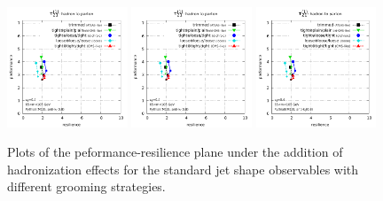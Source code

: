 \documentclass[11pt,letterpaper]{article}
\begin{document}
\begin{figure}
  \includegraphics[width=0.32\textwidth,page=25]{figures/grooming-scan-levels.pdf}
  \hfill
  \includegraphics[width=0.32\textwidth,page=13]{figures/grooming-scan-levels.pdf}
  \hfill
  \includegraphics[width=0.32\textwidth,page=31]{figures/grooming-scan-levels.pdf}
  \caption{Plots of the peformance-resilience plane under the addition of hadronization effects for the standard jet shape observables with different grooming strategies.}\label{fig:grooming-hadronisation}
\end{figure}
\end{document}
